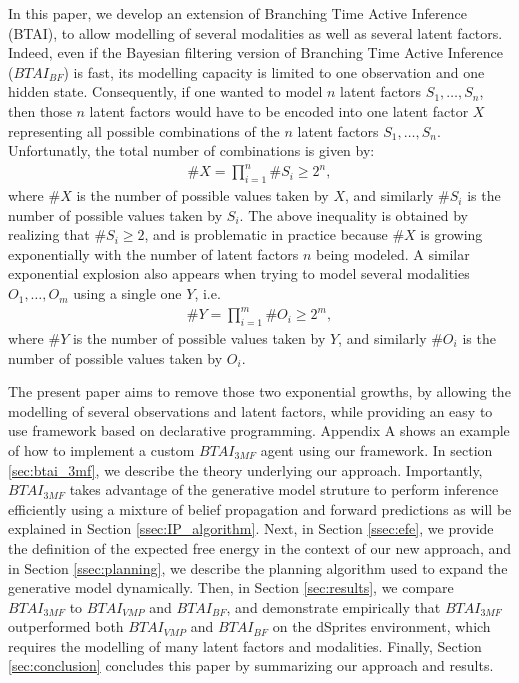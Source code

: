 \documentclass[twoside,11pt]{article}
\newcommand{\nb}[1]{\# #1}
\begin{document}
In this paper, we develop an extension of Branching Time Active Inference (BTAI), to allow modelling of several modalities as well as several latent factors. Indeed, even if the Bayesian filtering version of Branching Time Active Inference ($BTAI_{BF}$) is fast, its modelling capacity is limited to one observation and one hidden state. Consequently, if one wanted to model $n$ latent factors $S_1, \hdots, S_n$, then those $n$ latent factors would have to be encoded into one latent factor $X$ representing all possible combinations of the $n$ latent factors $S_1, \hdots, S_n$. Unfortunatly, the total number of combinations is given by:
\begin{align*}
\nb{X} = \prod_{i=1}^n \nb{S_i} \geq 2^n,
\end{align*}
where $\nb{X}$ is the number of possible values taken by $X$, and similarly $\nb{S_i}$ is the number of possible values taken by $S_i$. The above inequality is obtained by realizing that $\nb{S_i} \geq 2$, and is problematic in practice because $\nb{X}$ is growing exponentially with the number of latent factors $n$ being modeled. A similar exponential explosion also appears when trying to model several modalities $O_1, \hdots, O_m$ using a single one $Y$, i.e.
\begin{align*}
\nb{Y} = \prod_{i=1}^m \nb{O_i} \geq 2^m,
\end{align*}
where $\nb{Y}$ is the number of possible values taken by $Y$, and similarly $\nb{O_i}$ is the number of possible values taken by $O_i$. 

The present paper aims to remove those two exponential growths, by allowing the modelling of several observations and latent factors, while providing an easy to use framework based on declarative programming. Appendix A shows an example of how to implement a custom $BTAI_{3MF}$ agent using our framework. In section \ref{sec:btai_3mf}, we describe the theory underlying our approach. Importantly, $BTAI_{3MF}$ takes advantage of the generative model struture to perform inference efficiently using a mixture of belief propagation \citep{BP_and_DC, believe,belief_propagation} and forward predictions as will be explained in Section \ref{ssec:IP_algorithm}. Next, in Section \ref{ssec:efe}, we provide the definition of the expected free energy in the context of our new approach, and in Section \ref{ssec:planning}, we describe the planning algorithm used to expand the generative model dynamically. Then, in Section \ref{sec:results}, we compare $BTAI_{3MF}$ to $BTAI_{VMP}$ and $BTAI_{BF}$, and demonstrate empirically that $BTAI_{3MF}$ outperformed both $BTAI_{VMP}$ and $BTAI_{BF}$ on the dSprites environment, which requires the modelling of many latent factors and modalities. Finally, Section \ref{sec:conclusion} concludes this paper by summarizing our approach and results.
\end{document}
